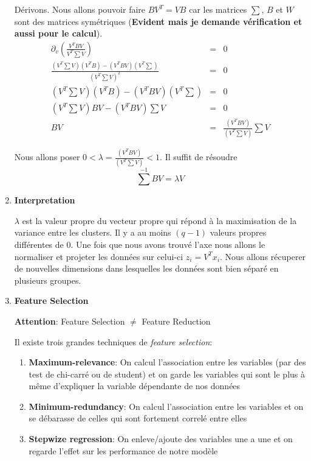 \documentclass[a4paper, 11pt, onecolumn]{article}
\begin{document}
\begin{enumerate}
\begin{framed}
Dérivons. Nous allons pouvoir faire $BV^T = VB$ car les matrices $\sum$, $B$ et $W$ sont des matrices symétriques (\textbf{Evident mais je demande vérification et aussi pour le calcul}).
\begin{eqnarray}
\partial_v\left(\frac{V^TBV}{V^T\sum V}\right) &=& 0\\
\frac{(V^T\sum V)(V^TB)-(V^TBV)(V^T\sum)}{(V^T\sum V)^2} &=& 0\\
(V^T\sum V)(V^TB)-(V^TBV)(V^T\sum) &=& 0\\
(V^T\sum V)BV-(V^TBV)\sum V &=& 0\\
BV &=& \frac{(V^TBV)}{(V^T\sum V)}\sum V
\end{eqnarray}
\end{framed}

Nous allons poser $0 < \lambda= \frac{(V^TBV)}{(V^T\sum V)} < 1$. Il suffit de résoudre
$$\sum^{-1} B V = \lambda V$$

\item \textbf{Interpretation}

$\lambda$ est la valeur propre du vecteur propre qui répond à la maximisation de la variance entre les clusters. Il y a au moins $(q-1)$ valeurs propres différentes de 0. Une fois que nous avons trouvé l'axe nous allons le normaliser et projeter les données sur celui-ci $z_i = V^Tx_i$. Nous allons récuperer de nouvelles dimensions dans lesquelles les données sont bien séparé en plusieurs groupes. 

\item \textbf{Feature Selection}

\textbf{Attention}: Feature Selection $\neq$ Feature Reduction

Il existe trois grandes techniques de \textit{feature selection}:
\begin{enumerate}
\item \textbf{Maximum-relevance}: On calcul l'association entre les variables (par des test de chi-carré ou de student) et on garde les variables qui sont le plus à même d'expliquer la variable dépendante de nos données
\item \textbf{Minimum-redundancy}: On calcul l'association entre les variables et on se débarasse de celles qui sont fortement correlé entre elles
\item \textbf{Stepwize regression}: On enleve/ajoute des variables une a une et on regarde l'effet sur les performance de notre modèle
\end{enumerate}


\end{enumerate}
\end{document}
